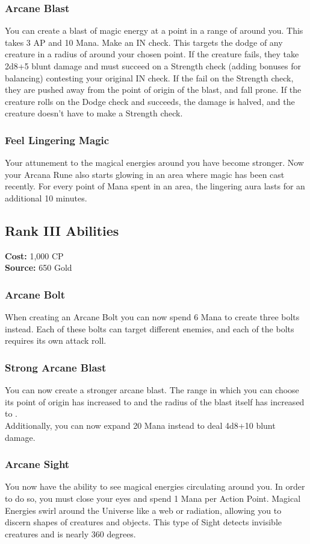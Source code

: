 \subsubsection{Arcane Blast}
You can create a blast of magic energy at a point in a range of  around you.
This takes 3 AP and 10 Mana.
Make an IN check.
This targets the dodge of any creature in a radius of  around your chosen point.
If the creature fails, they take 2d8+5 blunt damage and must succeed on a Strength check (adding bonuses for balancing) contesting your original IN check.
If the fail on the Strength check, they are pushed  away from the point of origin of the blast, and fall prone.
If the creature rolls on the Dodge check and succeeds, the damage is halved, and the creature doesn't have to make a Strength check.

\subsubsection{Feel Lingering Magic}
Your attunement to the magical energies around you have become stronger.
Now your Arcana Rune also starts glowing in an area where magic has been cast recently.
For every point of Mana spent in an area, the lingering aura lasts for an additional 10 minutes.

\subsection{Rank III Abilities}
\textbf{Cost:} 1,000 CP\\
\textbf{Source:} 650 Gold
\subsubsection{Arcane Bolt}
When creating an Arcane Bolt you can now spend 6 Mana to create three bolts instead.
Each of these bolts can target different enemies, and each of the bolts requires its own attack roll.

\subsubsection{Strong Arcane Blast}
You can now create a stronger arcane blast.
The range in which you can choose its point of origin has increased to  and the radius of the blast itself has increased to .\\
Additionally, you can now expand 20 Mana instead to deal 4d8+10 blunt damage.

\subsubsection{Arcane Sight}
You now have the ability to see magical energies circulating around you.
In order to do so, you must close your eyes and spend 1 Mana per Action Point.
Magical Energies swirl around the Universe like a web or radiation, allowing you to discern shapes of creatures and objects.
This type of Sight detects invisible creatures and is nearly 360 degrees.